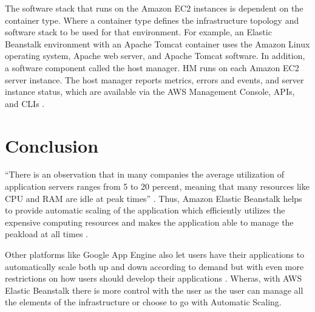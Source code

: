 \documentclass[9pt,twocolumn,twoside]{../../styles/osajnl}
\begin{document}
The software stack that runs on the Amazon EC2 instances is dependent
on the container type. Where a container type defines the
infrastructure topology and software stack to be used for that
environment. For example, an Elastic Beanstalk environment with an
Apache Tomcat container uses the Amazon Linux operating system, Apache
web server, and Apache Tomcat software. In addition, a software
component called the host manager. HM runs on each Amazon EC2 server
instance. The host manager reports metrics, errors and events, and
server instance status, which are available via the AWS Management
Console, APIs, and CLIs \cite{elastic-architecture}.

\section{Conclusion}

``There is an observation that in many companies the average
utilization of application servers ranges from 5 to 20 percent,
meaning that many resources like CPU and RAM are idle at peak times''
\cite{cloudcomputing-2}. Thus, Amazon Elastic Beanstalk helps to
provide automatic scaling of the application which efficiently
utilizes the expensive computing resources and makes the application
able to manage the peakload at all times \cite{elastic-faq}.

Other platforms like Google App Engine also let users have their
applications to automatically scale both up and down according to
demand but with even more restrictions on how users should develop
their applications \cite{google-appengine}. Wheras, with AWS Elastic
Beanstalk there is more control with the user as the user can manage
all the elements of the infrastructure or choose to go with Automatic
Scaling.



 
\end{document}
